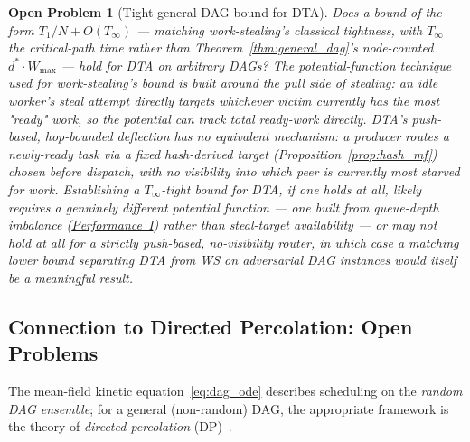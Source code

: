 \documentclass[11pt,a4paper]{report}
\newtheorem{openq}{Open Problem}[section]
\begin{document}
\begin{openq}[Tight general-DAG bound for DTA]
\label{open:general_dag}
Does a bound of the form $T_1/N + O(T_\infty)$ --- matching
work-stealing's classical tightness, with $T_\infty$ the critical-path
\emph{time} rather than Theorem~\ref{thm:general_dag}'s node-counted
$d^*\cdot W_{\max}$ --- hold for DTA on arbitrary DAGs? The
potential-function technique used for work-stealing's bound is built
around the \emph{pull} side of stealing: an idle worker's steal
attempt directly targets whichever victim currently has the most
"ready" work, so the potential can track total ready-work directly.
DTA's push-based, hop-bounded deflection has no equivalent mechanism:
a producer routes a newly-ready task via a fixed hash-derived target
(Proposition~\ref{prop:hash_mf}) chosen before dispatch, with no
visibility into which peer is currently most starved for work. Establishing a
$T_\infty$-tight bound for DTA, if one holds at all, likely requires a
genuinely different potential function --- one built from queue-depth
imbalance (\hyperref[chap:load_balance]{Performance~I}) rather than
steal-target availability --- or may not hold at all for a strictly
push-based, no-visibility router, in which case a matching
\emph{lower} bound separating DTA from WS on adversarial DAG instances
would itself be a meaningful result.
\end{openq}

\subsection{Connection to Directed Percolation: Open Problems}

The mean-field kinetic equation~\eqref{eq:dag_ode} describes scheduling
on the \emph{random DAG ensemble}; for a general (non-random) DAG,
the appropriate framework is the theory of
\emph{directed percolation} (DP)~\cite{hinrichsen2000}.
\end{document}
